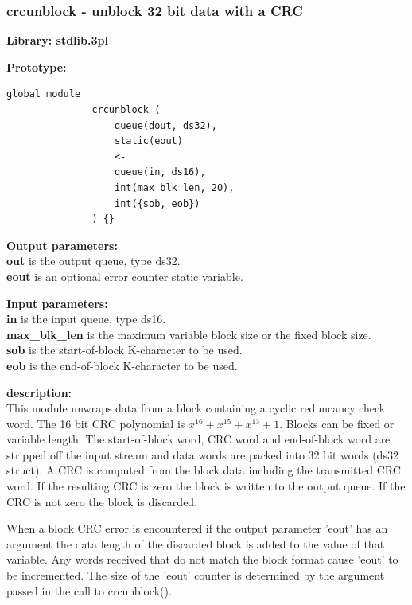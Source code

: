     
        \subsubsection{crcunblock - unblock 32 bit data with a CRC}\label{sec:lmcrcunblock}


            {\bf Library: stdlib.3pl}

            {\bf Prototype:} \\
            \vsp
            \begin{lstlisting}[gobble=12, language=threepl]
               global module
               crcunblock (
                   queue(dout, ds32),
                   static(eout)
                   <-
                   queue(in, ds16),
                   int(max_blk_len, 20),
                   int({sob, eob})
               ) {}
            \end{lstlisting}

            {\bf Output parameters:} \\
            {\bf out} is the output queue, type ds32.\\
            {\bf eout} is an optional error counter static variable.

            {\bf Input parameters:} \\
            {\bf in} is the input queue, type ds16.\\
            {\bf max\_blk\_len} is the maximum variable block size or the fixed
                    block size.\\
            {\bf sob} is the start-of-block K-character to be used.\\
            {\bf eob} is the end-of-block K-character to be used.

            {\bf description:} \\
            This module unwraps data from a block containing a cyclic reduncancy
            check word. The 16 bit CRC polynomial is $x^{16} + x^{15} + x^{13} +
            1$. Blocks can be fixed or variable length. The start-of-block word,
            CRC word and end-of-block word are stripped off the input stream and
            data words are packed into 32 bit words (ds32 struct). A CRC is
            computed from the block data including the transmitted CRC word. If
            the resulting CRC is zero the block is written to the output queue.
            If the CRC is not zero the block is discarded.
            
            When a block CRC error is encountered if the output parameter 'eout'
            has an argument the data length of the discarded block is added to
            the value of that variable. Any words received that do not match the
            block format cause 'eout' to be incremented. The size of the 'eout'
            counter is determined by the argument passed in the call to
            crcunblock().

